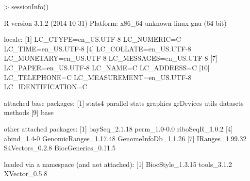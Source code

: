 \documentclass[a4paper]{article}
\begin{document}
\begin{Schunk}
\begin{Sinput}
> sessionInfo()
\end{Sinput}
\begin{Soutput}
R version 3.1.2 (2014-10-31)
Platform: x86_64-unknown-linux-gnu (64-bit)

locale:
 [1] LC_CTYPE=en_US.UTF-8       LC_NUMERIC=C               LC_TIME=en_US.UTF-8       
 [4] LC_COLLATE=en_US.UTF-8     LC_MONETARY=en_US.UTF-8    LC_MESSAGES=en_US.UTF-8   
 [7] LC_PAPER=en_US.UTF-8       LC_NAME=C                  LC_ADDRESS=C              
[10] LC_TELEPHONE=C             LC_MEASUREMENT=en_US.UTF-8 LC_IDENTIFICATION=C       

attached base packages:
[1] stats4    parallel  stats     graphics  grDevices utils     datasets  methods  
[9] base     

other attached packages:
[1] baySeq_2.1.18         perm_1.0-0.0          riboSeqR_1.0.2       
[4] abind_1.4-0           GenomicRanges_1.17.48 GenomeInfoDb_1.1.26  
[7] IRanges_1.99.32       S4Vectors_0.2.8       BiocGenerics_0.11.5  

loaded via a namespace (and not attached):
[1] BiocStyle_1.3.15 tools_3.1.2      XVector_0.5.8   
\end{Soutput}
\end{Schunk}
\end{document}
